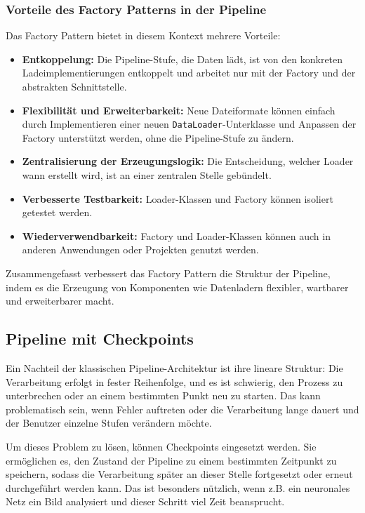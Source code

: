 \documentclass[10pt,a4paper]{article}
\begin{document}
\subsubsection{Vorteile des Factory Patterns in der Pipeline}
Das Factory Pattern bietet in diesem Kontext mehrere Vorteile:

\begin{itemize}
    \item \textbf{Entkoppelung:} Die Pipeline-Stufe, die Daten lädt, ist von den konkreten Ladeimplementierungen entkoppelt und arbeitet nur mit der Factory und der abstrakten Schnittstelle.
    \item \textbf{Flexibilität und Erweiterbarkeit:} Neue Dateiformate können einfach durch Implementieren einer neuen \texttt{DataLoader}-Unterklasse und Anpassen der Factory unterstützt werden, ohne die Pipeline-Stufe zu ändern.
    \item \textbf{Zentralisierung der Erzeugungslogik:} Die Entscheidung, welcher Loader wann erstellt wird, ist an einer zentralen Stelle gebündelt.
    \item \textbf{Verbesserte Testbarkeit:} Loader-Klassen und Factory können isoliert getestet werden.
    \item \textbf{Wiederverwendbarkeit:} Factory und Loader-Klassen können auch in anderen Anwendungen oder Projekten genutzt werden.
\end{itemize}

Zusammengefasst verbessert das Factory Pattern die Struktur der Pipeline, indem es die Erzeugung von Komponenten wie Datenladern flexibler, wartbarer und erweiterbarer macht.

\subsection{Pipeline mit Checkpoints}
Ein Nachteil der klassischen Pipeline-Architektur ist ihre lineare Struktur: Die Verarbeitung erfolgt in fester Reihenfolge, und es ist schwierig, den Prozess zu unterbrechen oder an einem bestimmten Punkt neu zu starten. Das kann problematisch sein, wenn Fehler auftreten oder die Verarbeitung lange dauert und der Benutzer einzelne Stufen verändern möchte.

Um dieses Problem zu lösen, können Checkpoints eingesetzt werden. Sie ermöglichen es, den Zustand der Pipeline zu einem bestimmten Zeitpunkt zu speichern, sodass die Verarbeitung später an dieser Stelle fortgesetzt oder erneut durchgeführt werden kann. Das ist besonders nützlich, wenn z.B. ein neuronales Netz ein Bild analysiert und dieser Schritt viel Zeit beansprucht.
\end{document}
